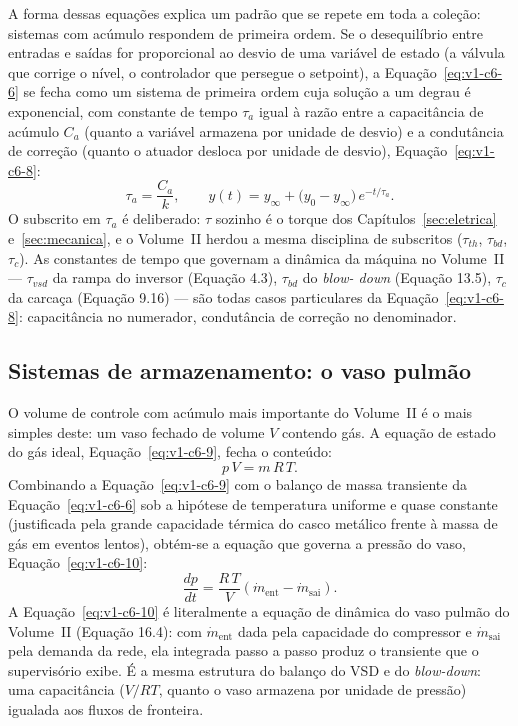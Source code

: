 \documentclass[12pt,a4paper]{article}
\numberwithin{equation}{section}
\numberwithin{table}{section}
\numberwithin{figure}{section}
\begin{document}
A forma dessas equações explica um padrão que se repete em toda a coleção:
sistemas com acúmulo respondem de primeira ordem. Se o desequilíbrio entre
entradas e saídas for proporcional ao desvio de uma variável de estado (a
válvula que corrige o nível, o controlador que persegue o setpoint), a
Equação~\eqref{eq:v1-c6-6} se fecha como um sistema de primeira ordem cuja
solução a um degrau é exponencial, com constante de tempo $\tau_a$ igual à
razão entre a capacitância de acúmulo $C_a$ (quanto a variável armazena por
unidade de desvio) e a condutância de correção (quanto o atuador desloca por
unidade de desvio), Equação~\eqref{eq:v1-c6-8}:
\begin{equation}\label{eq:v1-c6-8}
\tau_a = \frac{C_a}{k},
\qquad
y(t) = y_\infty + \bigl(y_0 - y_\infty\bigr)\,e^{-t/\tau_a}.
\end{equation}
O subscrito em $\tau_a$ é deliberado: $\tau$ sozinho é o torque dos
Capítulos~\ref{sec:eletrica} e~\ref{sec:mecanica}, e o Volume~II herdou a
mesma disciplina de subscritos ($\tau_{th}$, $\tau_{bd}$, $\tau_c$). As
constantes de tempo que governam a dinâmica da máquina no Volume~II ---
$\tau_{vsd}$ da rampa do inversor (Equação 4.3), $\tau_{bd}$ do \textit{blow-
down} (Equação 13.5), $\tau_c$ da carcaça (Equação 9.16) --- são todas casos
particulares da Equação~\eqref{eq:v1-c6-8}: capacitância no numerador,
condutância de correção no denominador.

\subsection{Sistemas de armazenamento: o vaso
pulmão}\label{sub:v1-c6-vaso}

O volume de controle com acúmulo mais importante do Volume~II é o mais
simples deste: um vaso fechado de volume $V$ contendo gás. A equação de
estado do gás ideal, Equação~\eqref{eq:v1-c6-9}, fecha o conteúdo:
\begin{equation}\label{eq:v1-c6-9}
p\,V = m\,R\,T .
\end{equation}
Combinando a Equação~\eqref{eq:v1-c6-9} com o balanço de massa transiente da
Equação~\eqref{eq:v1-c6-6} sob a hipótese de temperatura uniforme e quase
constante (justificada pela grande capacidade térmica do casco metálico
frente à massa de gás em eventos lentos), obtém-se a equação que governa a
pressão do vaso, Equação~\eqref{eq:v1-c6-10}:
\begin{equation}\label{eq:v1-c6-10}
\frac{dp}{dt} = \frac{R\,T}{V}\left(\dot{m}_{\text{ent}} -
\dot{m}_{\text{sai}}\right) .
\end{equation}
A Equação~\eqref{eq:v1-c6-10} é literalmente a equação de dinâmica do vaso
pulmão do Volume~II (Equação 16.4): com $\dot{m}_{\text{ent}}$ dada pela
capacidade do compressor e $\dot{m}_{\text{sai}}$ pela demanda da rede, ela
integrada passo a passo produz o transiente que o supervisório exibe. É a
mesma estrutura do balanço do VSD e do \textit{blow-down}: uma capacitância
($V/RT$, quanto o vaso armazena por unidade de pressão) igualada aos fluxos de
fronteira.
\end{document}
